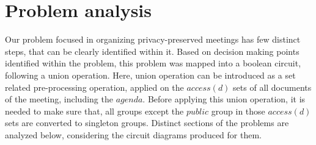 \documentclass{article}
\begin{document}
\section{Problem analysis}
Our problem focused in organizing privacy-preserved meetings has few distinct steps, that can be clearly identified within it. Based on decision making points identified within the problem, this problem was mapped into a boolean circuit, following a union operation. Here, union operation can be introduced as a set related pre-processing operation, applied on the $access(d)$ sets of all documents of the meeting, including the $agenda$. Before applying this union operation, it is needed to make sure that, all groups except the $public$ group in those $access(d)$ sets are converted to singleton groups. Distinct sections of the problems are analyzed below, considering the circuit diagrams produced for them.\\ \\
\end{document}
